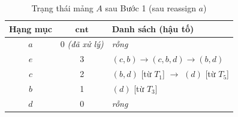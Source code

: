 \documentclass[12pt,a4paper]{report}
\begin{document}
\medskip
 
\begin{table}[H]
  \centering
  \caption{Trạng thái mảng $A$ sau Bước 1 (sau reassign $a$)}
  \label{tab:ex1-after1}
  \begin{tabular}{ccl}
    \toprule
    \textbf{Hạng mục} & $\mathbf{cnt}$ & \textbf{Danh sách (hậu tố)} \\
    \midrule
    $a$ & 0 \textit{(đã xử lý)} & \textit{rỗng} \\
    $e$ & 3 & $(c,b) \to (c,b,d) \to (b,d)$ \\
    $c$ & 2 & $(b,d)$ [từ $T_1$] $\to$ $(d)$ [từ $T_5$] \\
    $b$ & 1 & $(d)$ [từ $T_3$] \\
    $d$ & 0 & \textit{rỗng} \\
    \bottomrule
  \end{tabular}
\end{table}
 
\end{document}
